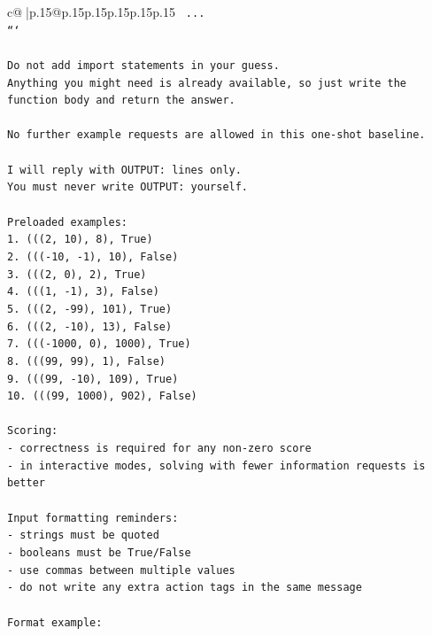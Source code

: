 \documentclass{article}
\begin{document}
{\begin{supertabular}{c@{$\;$}|p{.15\linewidth}@{}p{.15\linewidth}p{.15\linewidth}p{.15\linewidth}p{.15\linewidth}p{.15\linewidth}}
{{{\texttt{    ...} \\
\texttt{```} \\
\\ 
\texttt{Do not add import statements in your guess.} \\
\texttt{Anything you might need is already available, so just write the function body and return the answer.} \\
\\ 
\texttt{No further example requests are allowed in this one{-}shot baseline.} \\
\\ 
\texttt{I will reply with OUTPUT: lines only.} \\
\texttt{You must never write OUTPUT: yourself.} \\
\\ 
\texttt{Preloaded examples:} \\
\texttt{1. (((2, 10), 8), True)} \\
\texttt{2. ((({-}10, {-}1), 10), False)} \\
\texttt{3. (((2, 0), 2), True)} \\
\texttt{4. (((1, {-}1), 3), False)} \\
\texttt{5. (((2, {-}99), 101), True)} \\
\texttt{6. (((2, {-}10), 13), False)} \\
\texttt{7. ((({-}1000, 0), 1000), True)} \\
\texttt{8. (((99, 99), 1), False)} \\
\texttt{9. (((99, {-}10), 109), True)} \\
\texttt{10. (((99, 1000), 902), False)} \\
\\ 
\texttt{Scoring:} \\
\texttt{{-} correctness is required for any non{-}zero score} \\
\texttt{{-} in interactive modes, solving with fewer information requests is better} \\
\\ 
\texttt{Input formatting reminders:} \\
\texttt{{-} strings must be quoted} \\
\texttt{{-} booleans must be True/False} \\
\texttt{{-} use commas between multiple values} \\
\texttt{{-} do not write any extra action tags in the same message} \\
\\ 
\texttt{Format example:} \\
}}}
\end{supertabular}}
\end{document}
